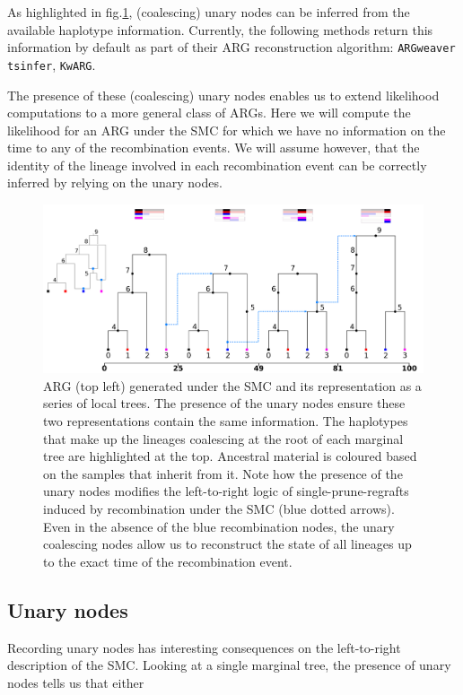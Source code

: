 \documentclass{article}
\newcommand{\tsinfer}[0]{\texttt{tsinfer}}
\newcommand{\kwarg}[0]{\texttt{KwARG}}
\newcommand{\argweaver}[0]{\texttt{ARGweaver}}
\begin{document}
As highlighted in fig.\ref{fig:smc-unary}, (coalescing) unary nodes can be inferred 
from the available haplotype information. Currently, the following methods 
return this information by default as part of their ARG reconstruction algorithm: 
\argweaver \citep{rasmussen_genome-wide_2014} 
\tsinfer \citep{kelleher_inferring_2019}, 
\kwarg \citep{ignatieva_kwarg_2021}.

The presence of these (coalescing) unary nodes enables us to extend likelihood 
computations to a more general class of ARGs.
Here we will compute the likelihood for an ARG
under the SMC for which we have no information on the time to any 
of the recombination events. 
We will assume however, that the identity 
of the lineage involved in each recombination event can be correctly 
inferred by relying on the unary nodes.


\begin{figure}[!ht]
\centering
\includegraphics[width=\textwidth]{figures/smc-custom-haplotypes-mini.png}
\caption{ARG (top left) generated under the SMC and its representation as a 
series of local trees. The presence of the unary nodes ensure these two 
representations contain the same information.
The haplotypes that make up the lineages coalescing 
at the root of each marginal tree are highlighted at the top. Ancestral 
material is coloured based on the samples that inherit from it.
Note how the presence of the unary nodes 
modifies the left-to-right logic of single-prune-regrafts induced by 
recombination under the SMC (blue dotted arrows).
Even in the absence of the blue recombination nodes, 
the unary coalescing nodes allow us to reconstruct the state of all lineages 
up to the exact time of the recombination event.
}
\label{fig:smc-unary}
\end{figure}

\subsection{Unary nodes} \label{par:unary}
Recording unary nodes has interesting consequences on the left-to-right 
description of the SMC. Looking at a single marginal tree, the presence of 
unary nodes tells us that either \\
\end{document}
